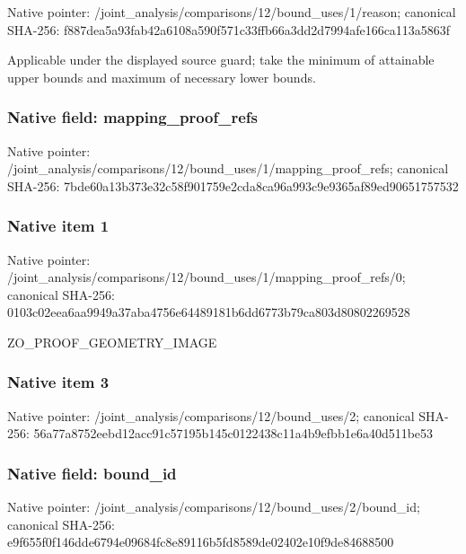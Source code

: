 \documentclass[10pt,a4paper]{article}
\begin{document}
Native pointer: /joint\_analysis/comparis\allowbreak{}ons/12/bound\_uses/1/reas\allowbreak{}on; canonical SHA-256: f887dea5a93fab42a6108a59\allowbreak{}0f571c33ffb66a3dd2d7994a\allowbreak{}fe166ca113a5863f


Applicable under the displayed source guard; take the minimum of attainable upper bounds and maximum of necessary lower bounds.


\subsubsection{Native field: mapping\_proof\_refs}


Native pointer: /joint\_analysis/comparis\allowbreak{}ons/12/bound\_uses/1/mapp\allowbreak{}ing\_proof\_refs; canonical SHA-256: 7bde60a13b373e32c58f9017\allowbreak{}59e2cda8ca96a993c9e9365a\allowbreak{}f89ed90651757532



\subsubsection{Native item 1}


Native pointer: /joint\_analysis/comparis\allowbreak{}ons/12/bound\_uses/1/mapp\allowbreak{}ing\_proof\_refs/0; canonical SHA-256: 0103c02eea6aa9949a37aba4\allowbreak{}756e64489181b6dd6773b79c\allowbreak{}a803d80802269528


ZO\_PROOF\_GEOMETRY\_IMAGE


\subsubsection{Native item 3}


Native pointer: /joint\_analysis/comparis\allowbreak{}ons/12/bound\_uses/2; canonical SHA-256: 56a77a8752eebd12acc91c57\allowbreak{}195b145c0122438c11a4b9ef\allowbreak{}bb1e6a40d511be53



\subsubsection{Native field: bound\_id}


Native pointer: /joint\_analysis/comparis\allowbreak{}ons/12/bound\_uses/2/boun\allowbreak{}d\_id; canonical SHA-256: e9f655f0f146dde6794e0968\allowbreak{}4fc8e89116b5fd8589de0240\allowbreak{}2e10f9de84688500
\end{document}
